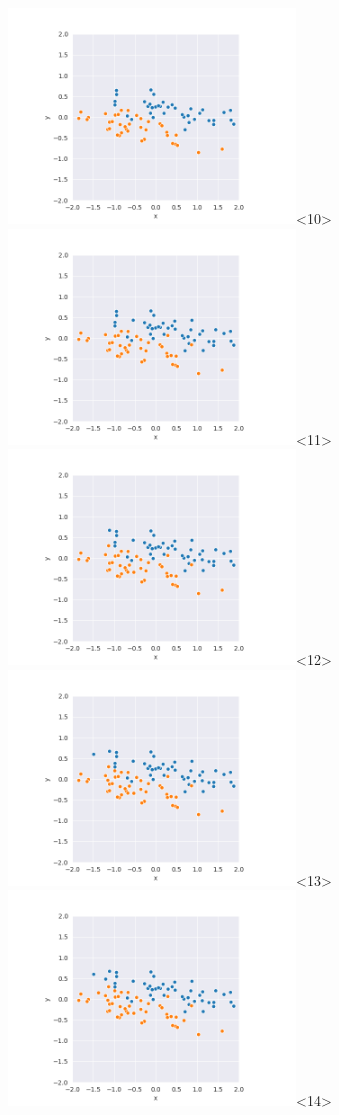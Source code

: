 \begin{frame}
  \includegraphics[width=3in]{../png/ward_stretch/ward_stretch_46.png}<10>
  \includegraphics[width=3in]{../png/ward_stretch/ward_stretch_51.png}<11>
  \includegraphics[width=3in]{../png/ward_stretch/ward_stretch_56.png}<12>
  \includegraphics[width=3in]{../png/ward_stretch/ward_stretch_61.png}<13>
  \includegraphics[width=3in]{../png/ward_stretch/ward_stretch_66.png}<14>

\end{frame}
